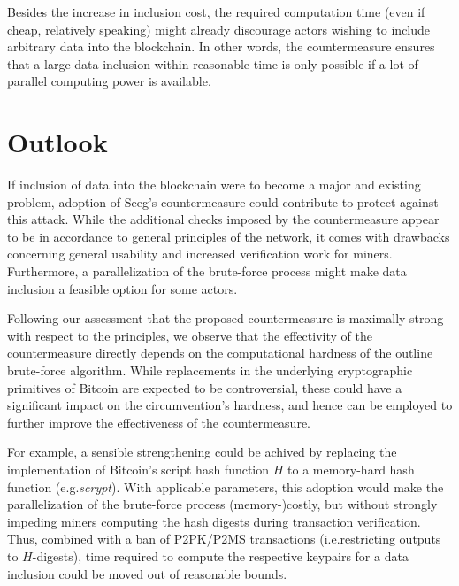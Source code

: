 \documentclass[a4paper,11pt,titlepage]{scrbook}
\begin{document}
Besides the increase in inclusion cost, the required computation time (even if cheap, relatively speaking) might already discourage actors wishing to include arbitrary data into the blockchain.
In other words, the countermeasure ensures that a large data inclusion within reasonable time is only possible if a lot of parallel computing power is available.

\section{Outlook}

If inclusion of data into the blockchain were to become a major and existing problem, adoption of Seeg's countermeasure could contribute to protect against this attack.
While the additional checks imposed by the countermeasure appear to be in accordance to general principles of the network, it comes with drawbacks concerning general usability and increased verification work for miners.
Furthermore, a parallelization of the brute-force process might make data inclusion a feasible option for some actors.

Following our assessment that the proposed countermeasure is maximally strong with respect to the principles, we observe that the effectivity of the countermeasure directly depends on the computational hardness of the outline brute-force algorithm.
%
While replacements in the underlying cryptographic primitives of Bitcoin are expected to be controversial, 
these could have a significant impact on the circumvention's hardness, and hence can be employed to further improve the effectiveness of the countermeasure.

For example, a sensible strengthening could be achived by replacing the implementation of Bitcoin's script hash function $H$ to a memory-hard hash function (e.g.\@ \emph{scrypt}).
With applicable parameters, this adoption would make the parallelization of the brute-force process (memory-)costly, but without strongly impeding miners computing the hash digests during transaction verification.
Thus, combined with a ban of P2PK/P2MS transactions (i.e.\@ restricting outputs to $H$-digests), time required to compute the respective keypairs for a data inclusion could be moved out of reasonable bounds.

\end{document}
